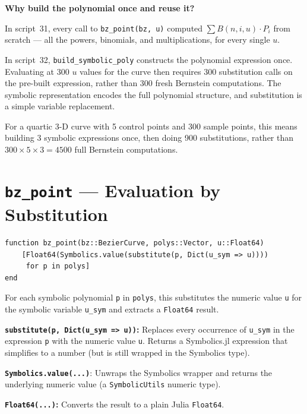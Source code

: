 \documentclass[12pt, a4paper]{article}
\newcommand{\cd}[1]{\texttt{#1}}
\begin{document}
\begin{notebox}
\textbf{Why build the polynomial once and reuse it?}

In script~31, every call to \cd{bz\_point(bz, u)} computed
$\sum B(n,i,u) \cdot P_i$ from scratch --- all the
powers, binomials, and multiplications, for every single $u$.

In script~32, \cd{build\_symbolic\_poly} constructs the
polynomial expression once.
Evaluating at 300 $u$ values for the curve then requires
300 substitution calls on the pre-built expression,
rather than 300 fresh Bernstein computations.
The symbolic representation encodes the full polynomial
structure, and substitution is a simple variable replacement.

For a quartic 3-D curve with 5 control points and
300 sample points, this means building 3 symbolic
expressions once, then doing 900 substitutions,
rather than $300 \times 5 \times 3 = 4500$ full
Bernstein computations.
\end{notebox}


\section{\texttt{bz\_point} --- Evaluation by Substitution}

\begin{verbatim}
function bz_point(bz::BezierCurve, polys::Vector, u::Float64)
    [Float64(Symbolics.value(substitute(p, Dict(u_sym => u))))
     for p in polys]
end
\end{verbatim}

For each symbolic polynomial \cd{p} in \cd{polys},
this substitutes the numeric value \cd{u} for the
symbolic variable \cd{u\_sym} and extracts a
\cd{Float64} result.

\textbf{\cd{substitute(p, Dict(u\_sym => u))}:}
Replaces every occurrence of \cd{u\_sym} in the
expression \cd{p} with the numeric value \cd{u}.
Returns a Symbolics.jl expression that simplifies to
a number (but is still wrapped in the Symbolics type).

\textbf{\cd{Symbolics.value(...)}}:
Unwraps the Symbolics wrapper and returns the underlying
numeric value (a \cd{SymbolicUtils} numeric type).

\textbf{\cd{Float64(...)}:}
Converts the result to a plain Julia \cd{Float64}.
\end{document}
